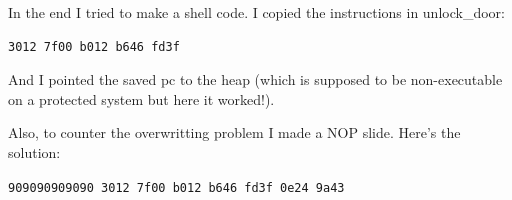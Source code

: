 \documentclass[a4paper,11pt]{article}
\begin{document}
In the end I tried to make a shell code. I copied the instructions in
unlock\_door:

\begin{verbatim}
3012 7f00 b012 b646 fd3f
\end{verbatim}

And I pointed the saved pc to the heap (which is supposed to be
non-executable on a protected system but here it worked!).

Also, to counter the overwritting problem I made a NOP slide. Here's the
solution:

\texttt{909090909090 3012 7f00 b012 b646 fd3f 0e24 9a43}
\end{document}
